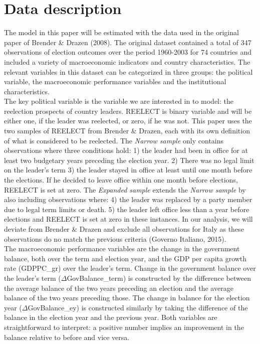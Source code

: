 \documentclass[12pt]{article}
\begin{document}
\section{Data description}
The model in this paper will be estimated with the data used in the original paper of Brender \& Drazen (2008). The original dataset contained a total of 347 observations of election outcomes over the period 1960-2003 for 74 countries and included a variety of macroeconomic indicators and country characteristics. The relevant variables in this dataset can be categorized in three groups: the political variable, the macroeconomic performance variables and the institutional characteristics.\\  
The key political variable is the variable we are interested in to model: the reelection prospects of country leaders. REELECT is binary variable and will be either one, if the leader was reelected, or zero, if he was not. This paper uses the two samples of REELECT from Brender \& Drazen, each with its own definition of what is considered to be reelected. The \textit{Narrow sample} only contains observations where three conditions hold: 1) the leader had been in office for at least two budgetary years preceding the election year. 2) There was no legal limit on the leader's term 3) the leader stayed in office at least until one month before the elections. If he decided to leave office within one month before elections, REELECT is set at zero. The \textit{Expanded sample} extends the \textit{Narrow sample} by also including observations where: 4) the leader was replaced by a party member due to legal term limits or death. 5) the leader left office less than a year before elections and REELECT is set at zero in these instances. In our analysis, we will deviate from Brender \& Drazen and exclude all observations for Italy as these observations do no match the previous criteria (Governo Italiano, 2015).\\
The macroeconomic performance variables are the change in the government balance, both over the term and election year, and the GDP per capita growth rate (GDPPC\_gr) over the leader's term. Change in the government balance over the leader's term ($\Delta$GovBalance\_term) is constructed by the difference between the average balance of the two years preceding an election and the average balance of the two years preceding those. The change in balance for the election year ($\Delta$GovBalance\_ey) is constructed similarly by taking the difference of the balance in the election year and the previous year. Both variables are straightforward to interpret: a positive number implies an improvement in the balance relative to before and vice versa.\\
\end{document}
